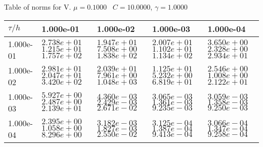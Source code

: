 \begin{center}
Table of norms for V. $\mu = 0.1000$ \, $C = 10.0000$, $\gamma = 1.0000$
  
\begin{tabular}{|p{1in}|p{1in}|p{1in}|p{1in}|p{1in}|} \hline
$\tau / h$ &1.000e-01 &1.000e-02 &1.000e-03 &1.000e-04 \\ \hline 
1.000e-01 & $2.738e+01$  $1.215e+01$  $1.757e+02$  & $1.947e+01$  $7.508e+00$  $1.838e+02$  & $2.007e+01$  $1.102e+01$  $1.134e+02$  & $3.650e+00$  $2.328e+00$  $2.934e+01$  \\ \hline 
1.000e-02 & $2.981e+01$  $2.047e+01$  $3.420e+02$  & $2.039e+01$  $7.961e+00$  $1.048e+03$  & $1.125e+01$  $5.232e+00$  $6.819e+01$  & $2.546e+00$  $1.008e+00$  $2.122e+01$  \\ \hline 
1.000e-03 & $5.927e+00$  $2.487e+00$  $2.139e+01$  & $4.360e-03$  $2.429e-03$  $2.671e-02$  & $3.065e-03$  $1.361e-03$  $9.235e-03$  & $3.059e-03$  $1.358e-03$  $9.250e-03$  \\ \hline 
1.000e-04 & $2.395e+00$  $1.058e+00$  $8.296e+00$  & $3.182e-03$  $1.827e-03$  $2.550e-02$  & $3.125e-04$  $1.387e-04$  $9.413e-04$  & $3.066e-04$  $1.347e-04$  $9.258e-04$  \\ \hline 

\end{tabular}\\[20pt]
\end{center}
